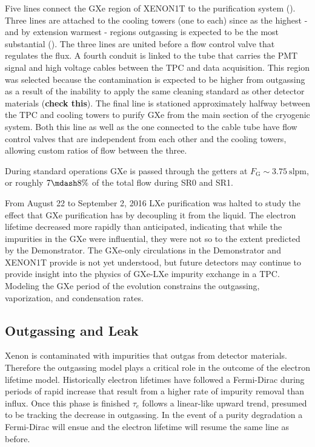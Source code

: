 Five lines connect the GXe region of XENON1T to the purification system ().  Three lines are attached to
the cooling towers (one to each) since as the highest - and by extension warmest - regions outgassing is expected to be the most
substantial ().  The three lines are united before a flow control valve
that regulates the flux.  A fourth conduit is linked to the tube that carries the PMT signal and high voltage cables between the TPC and
data acquisition.  This region was selected because the contamination is expected to be higher from outgassing as a result of the
inability to apply the same cleaning standard as other detector materials (\textbf{check this}).  The final line is stationed
approximately halfway between the TPC and cooling towers to purify GXe from the main section of the cryogenic system.  Both this line as
well
as the one connected to the cable tube have flow control valves that are independent from each other and the cooling towers, allowing
custom ratios of flow between the three.

During standard operations GXe is passed through the getters at $F_{\mathrm{G}} {\sim} 3.75\ \mathrm{slpm}$, or roughly $7 \mdash 8\%$ of
the total flow during SR0 and SR1.

From August 22 to September 2, 2016 LXe purification was halted to study the effect that GXe purification has by
decoupling it from the liquid.  The electron lifetime decreased more rapidly than anticipated, indicating that while the
impurities in the GXe were influential, they were not so to the extent predicted by the Demonstrator.  The GXe-only circulations in the
Demonstrator and XENON1T provide is not yet understood, but future detectors may continue to provide insight into
the physics of GXe-LXe impurity exchange in a TPC.  Modeling the GXe period of the evolution constrains the outgassing,
vaporization, and condensation rates.



\subsection{Outgassing and Leak}
\label{subsec:electron_lifetime_model_outgassing}
Xenon is contaminated with impurities that outgas from detector materials.  Therefore the outgassing model plays a
critical role in the outcome of the electron lifetime model.  Historically electron lifetimes have followed a Fermi-Dirac during periods
of rapid increase that result from a higher rate of impurity
removal than influx.  Once this phase is
finished $\tau_e$ follows a linear-like upward trend, presumed to be tracking the decrease in outgassing.  In the event of a
purity degradation a Fermi-Dirac will ensue and the electron lifetime will resume the same line as before.

